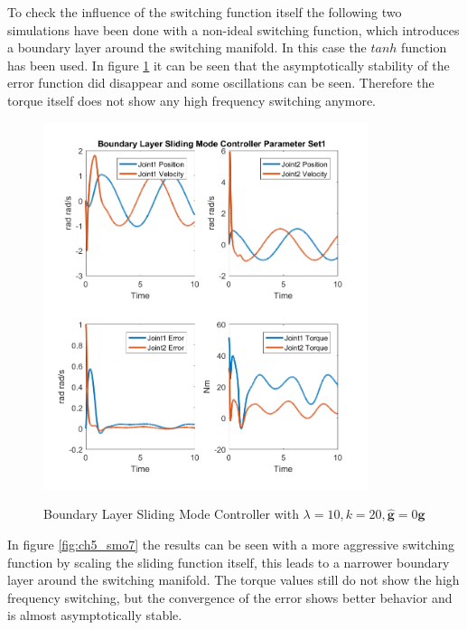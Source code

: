To check the influence of the switching function itself the following two simulations have been done with a non-ideal switching function, which introduces a boundary layer around the switching manifold. In this case the $tanh$ function has been used. In figure \ref{fig:ch5_smo6} it can be seen that the asymptotically stability of the error function did disappear and some oscillations can be seen. Therefore the torque itself does not show any high frequency switching anymore.
\begin{figure}[]
	\centering
	\includegraphics[width=0.85\textwidth]{pics/BoundaryLayerSlidingModeControllerParameterSet1.png}\\
	\caption{Boundary Layer Sliding Mode Controller with $\lambda = 10, k=20,\hat{\mathbf{g}}=0\mathbf{g}$  }
	\label{fig:ch5_smo6}
\end{figure}

In figure \ref{fig:ch5_smo7} the results can be seen with a more aggressive switching function by scaling the sliding function itself, this leads to a narrower boundary layer around the switching manifold. The torque values still do not show the high frequency switching, but the convergence of the error shows better behavior and is almost asymptotically stable.

